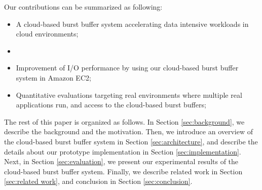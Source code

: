 Our contributions can be summarized as following:
\begin{itemize}
	\item A cloud-based burst buffer system accelerating data intensive
	workloads in cloud environments;
	\item {}
	\item Improvement of I/O performance by using our cloud-based burst buffer
	system in Amazon EC2;
    \item Quantitative evaluations targeting real environments where
    multiple real applications run, and access to the cloud-based burst buffers;
\end{itemize}
\par
The rest of this paper is organized as follows. 
In Section \ref{sec:background}, we describe the background and the motivation.
Then, we introduce an overview of the cloud-based burst buffer system in Section \ref{sec:architecture}, 
and describe the details about our prototype implementation in Section \ref{sec:implementation}.
Next, in Section \ref{sec:evaluation}, we present our experimental results
of the cloud-based burst buffer system.
Finally, we describe related work in Section \ref{sec:related work}, and
conclusion in Section \ref{sec:conclusion}.
